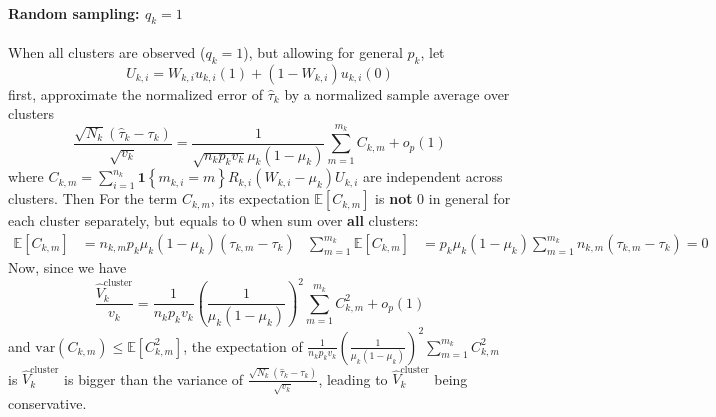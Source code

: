 \documentclass[twoside]{article}
\begin{document}
\paragraph*{Random sampling: $q_k=1$}
When all clusters are observed ($q_k=1$), but allowing for general $p_k$, let 
$$
U_{k,i} = W_{k,i} u_{k,i}(1) + (1-W_{k,i})u_{k,i}(0)
$$
first, approximate the normalized error of $\hat{\tau}_k$ by a normalized sample average over clusters 
\begin{equation*}
    \frac{\sqrt{N_k}\left(\hat{\tau}_k-\tau_k\right)}{\sqrt{v_k}} = \frac{1}{\sqrt{n_kp_kv_k}\mu_k\left(1-\mu_k\right)}\sum^{m_k}_{m=1}C_{k,m} + o_p(1)
\end{equation*}
where $C_{k,m}=\sum^{n_k}_{i=1}\mathbf{1}\left\{m_{k,i}=m\right\} R_{k,i}\left(W_{k,i}-\mu_k\right) U_{k,i}$ are independent across clusters. Then 
For the term $C_{k,m}$, its expectation $\mathbb{E}\left[C_{k,m}\right]$ is \textbf{not} 0 in general for each cluster separately, but equals to 0 when sum over \textbf{all} clusters:
\begin{align*}
    \mathbb{E}\left[C_{k,m}\right] &= n_{k,m}p_k\mu_k \left(1-\mu_k\right)\left(\tau_{k,m}-\tau_k\right) & \sum^{m_k}_{m=1}\mathbb{E}\left[C_{k,m}\right] &= p_k\mu_k \left(1-\mu_k\right) \sum^{m_k}_{m=1} n_{k,m}\left(\tau_{k,m}-\tau_k\right) = 0
\end{align*}
Now, since we have 
\begin{equation*}
    \frac{\hat{V}^{\text{cluster}}_k}{v_k} = \frac{1}{n_kp_kv_k} \left(\frac{1}{\mu_k(1-\mu_k)}\right)^2 \sum^{m_k}_{m=1}C^2_{k,m} + o_p(1)
\end{equation*}
and $\mathrm{var}\left(C_{k,m}\right) \leq \mathbb{E}\left[C^2_{k,m}\right]$, the expectation of $\frac{1}{n_kp_kv_k} \left(\frac{1}{\mu_k(1-\mu_k)}\right)^2 \sum^{m_k}_{m=1}C^2_{k,m}$ is  $\hat{V}^{\text{cluster}}_k$ is bigger than the variance of $\frac{\sqrt{N_k}\left(\hat{\tau}_k-\tau_k\right)}{\sqrt{v_k}}$, leading to $\hat{V}^{\text{cluster}}_k$ being conservative.
\end{document}
